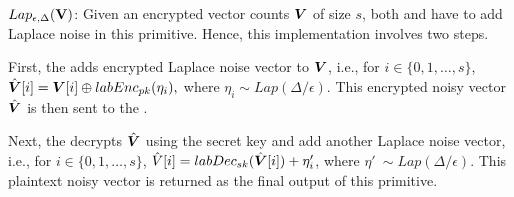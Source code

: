 {}


 $Lap_{\epsilon,\Delta}(\mathbf{V})$: Given an encrypted vector counts $\boldsymbol{V}$ of size $s$, both \AS and \CPS have to add Laplace noise in this primitive. Hence, this implementation involves two steps.

First, the \AS adds encrypted Laplace noise vector to $\boldsymbol{V}$, i.e., for $i\in \{0,1,\ldots,s\}$, $\hat{\boldsymbol{V}}[i]  = \boldsymbol{V}[i] \oplus labEnc_{pk}(\eta_i),$ where $\eta_i\sim Lap(\Delta/\epsilon)$. This encrypted noisy vector $\hat{\boldsymbol{V}}$ is then sent to the \CPS.

Next, the \CPS decrypts $\hat{\boldsymbol{V}}$ using the secret key and add another Laplace noise vector, i.e., for  $i\in \{0,1,\ldots,s\}$, $\hat{V}[i] = labDec_{sk}(\hat{\boldsymbol{V}}[i]) +\eta'_i$, where $\eta'~\sim Lap(\Delta/\epsilon)$. This plaintext noisy vector is returned as the final output of this primitive.



